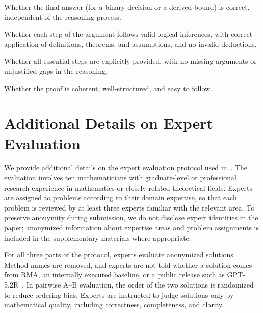 \documentclass{article}
\newcommand{\modelname}{\textsc{RMA}\xspace}
\begin{document}
\begin{description}[leftmargin=1.5em, style=nextline]
    \item[\textbf{Final answer accuracy (0--1).}] 
    Whether the final answer (for a binary decision or a derived bound) is correct, independent of the reasoning process.

    \item[\textbf{Logical correctness (0--5).}] 
    Whether each step of the argument follows valid logical inferences, with correct application of definitions, theorems, and assumptions, and no invalid deductions.

    \item[\textbf{Proof completeness (0--5).}] 
    Whether all essential steps are explicitly provided, with no missing arguments or unjustified gaps in the reasoning.

    \item[\textbf{Proof clarity (0--5).}] 
    Whether the proof is coherent, well-structured, and easy to follow.
\end{description}
\section{Additional Details on Expert Evaluation}
\label{app-expert-evaluation}

We provide additional details on the expert evaluation protocol used in~. The evaluation involves ten mathematicians with graduate-level or professional research experience in mathematics or closely related theoretical fields. Experts are assigned to problems according to their domain expertise, so that each problem is reviewed by at least three experts familiar with the relevant area. To preserve anonymity during submission, we do not disclose expert identities in the paper; anonymized information about expertise areas and problem assignments is included in the supplementary materials where appropriate.

For all three parts of the protocol, experts evaluate anonymized solutions. Method names are removed, and experts are not told whether a solution comes from \modelname, an internally executed baseline, or a public release such as GPT-5.2R~\citep{openai_first_proof_2025}. In pairwise A--B evaluation, the order of the two solutions is randomized to reduce ordering bias. Experts are instructed to judge solutions only by mathematical quality, including correctness, completeness, and clarity.
\end{document}

